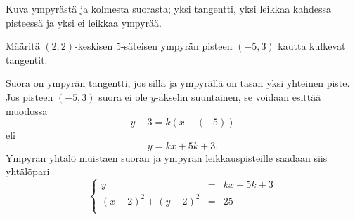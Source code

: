 Kuva ympyrästä ja kolmesta suorasta; yksi tangentti, yksi leikkaa kahdessa pisteessä ja yksi ei leikkaa ympyrää.


\begin{esimerkki}

Määritä $(2, 2)$-keskisen 5-säteisen ympyrän pisteen $(-5, 3)$ kautta kulkevat tangentit.

\begin{esimratk}
Suora on ympyrän tangentti, jos sillä ja ympyrällä on tasan yksi yhteinen piste. Jos pisteen $(-5, 3)$ suora ei ole $y$-akselin suuntainen, se voidaan esittää muodossa
\[
y-3 = k(x-(-5))
\]
eli
\[
y = kx+5k+3.
\]
Ympyrän yhtälö muistaen suoran ja ympyrän leikkauspisteille saadaan siis yhtälöpari
$$\left\{    
    \begin{array}{rcl}
        y &=&kx+5k+3\\
        (x-2)^2+(y-2)^2 &=& 25 \\
    \end{array}
    \right.$$
    

\end{esimratk}
\end{esimerkki}
